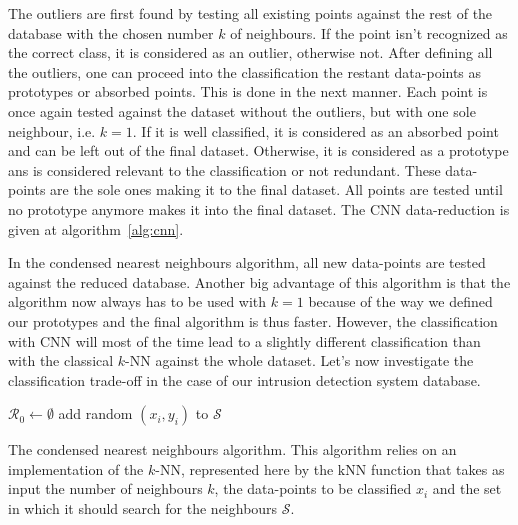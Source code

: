 The outliers are first found by testing all existing points against the rest of the database with the chosen number $k$ of neighbours. If the point isn't recognized as the correct class, it is considered as an outlier, otherwise not. After defining all the outliers, one can proceed into the classification the restant data-points as prototypes or absorbed points. This is done in the next manner. Each point is once again tested against the dataset without the outliers, but with one sole neighbour, i.e. $k=1$. If it is well classified, it is considered as an absorbed point and can be left out of the final dataset. Otherwise, it is considered as a prototype ans is considered relevant to the classification or not redundant. These data-points are the sole ones making it to the final dataset. All points are tested until no prototype anymore makes it into the final dataset. The CNN data-reduction is given at algorithm~\ref{alg:cnn}.

In the condensed nearest neighbours algorithm, all new data-points are tested against the reduced database. Another big advantage of this algorithm is that the algorithm now always has to be used with $k=1$ because of the way we defined our prototypes and the final algorithm is thus faster. However, the classification with CNN will most of the time lead to a slightly different classification than with the classical $k$-NN against the whole dataset. Let's now investigate the classification trade-off in the case of our intrusion detection system database. 

\begin{center}
\begin{algorithm}[H]
\DontPrintSemicolon
{}

$\mathcal{R}_0 \leftarrow \emptyset$ \;
add random $\left(x_i, y_i\right)$ to $\mathcal{S}$ \;

\caption{The condensed nearest neighbours algorithm. This algorithm relies on an implementation of the $k$-NN, represented here by the $\mathrm{kNN}$ function that takes as input the number of neighbours $k$, the data-points to be classified $x_i$ and the set in which it should search for the neighbours $\mathcal{S}$.}
\label{alg:cnn}
\end{algorithm}
\end{center}

